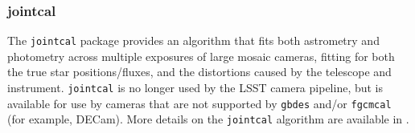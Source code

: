 \subsubsection{jointcal}
\label{sec:jointcal}

The \texttt{jointcal} package provides an algorithm that fits both astrometry and photometry across multiple exposures of large mosaic cameras, fitting for both the true star positions/fluxes, and the distortions caused by the telescope and instrument.
\texttt{jointcal} is no longer used by the LSST camera pipeline, but is available for use by cameras that are not supported by \texttt{gbdes} and/or \texttt{fgcmcal} (for example, DECam).
More details on the \texttt{jointcal} algorithm are available in \citet{DMTN-036}.
